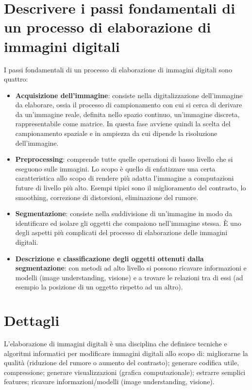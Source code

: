 \section{Descrivere i passi fondamentali di un processo di elaborazione di immagini digitali}
I passi fondamentali di un processo di elaborazione di immagini digitali sono quattro:
\begin{itemize}

\item \textbf{Acquisizione dell'immagine}: consiste nella digitalizzazione dell'immagine da elaborare, ossia il processo di campionamento con cui si cerca di derivare da un'immagine reale, definita nello spazio continuo, un'immagine discreta, rappresentabile come matrice. In questa fase avviene quindi la scelta del campionamento spaziale e in ampiezza da cui dipende la risoluzione dell'immagine.

\item \textbf{Preprocessing}: comprende tutte quelle operazioni di basso livello che si eseguono sulle immagini. Lo scopo è quello di enfatizzare una certa caratteristica allo scopo di rendere più adatta l'immagine a computazioni future di livello più alto. Esempi tipici sono il miglioramento del contrasto, lo smoothing, correzione di distorsioni, eliminazione del rumore.

\item \textbf{Segmentazione}: consiste nella suddivisione di un'immagine in modo da identificare ed isolare gli oggetti che compaiono nell'immagine stessa. È uno degli aspetti più complicati del processo di elaborazione delle immagini digitali.

\item \textbf{Descrizione e classificazione degli oggetti ottenuti dalla segmentazione}: con metodi ad alto livello si possono ricavare informazioni e modelli (image
understanding, visione) e a trovare le relazioni tra di essi (ad esempio la posizione di un oggetto rispetto ad un altro).
\end{itemize}

\section{Dettagli}
L'elaborazione di immagini digitali è una disciplina che definisce tecniche e algoritmi informatici per modificare immagini digitali allo scopo di: migliorarne la qualità (riduzione del rumore o aumento del contrasto); generare codifica utile, compressione; generare visualizzazioni (grafica computazionale); estrarre semplici features; ricavare informazioni/modelli (image understanding, visione).

